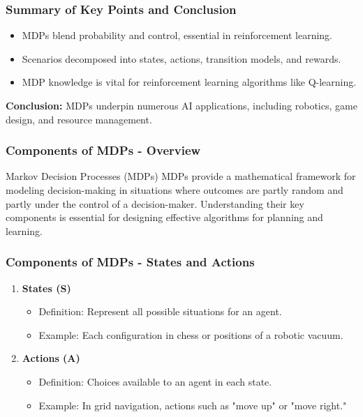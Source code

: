 \documentclass[aspectratio=169]{beamer}
\begin{document}
\begin{frame}[fragile]
    \frametitle{Summary of Key Points and Conclusion}
    \begin{itemize}
        \item MDPs blend probability and control, essential in reinforcement learning.
        \item Scenarios decomposed into states, actions, transition models, and rewards.
        \item MDP knowledge is vital for reinforcement learning algorithms like Q-learning.
    \end{itemize}
    
    \textbf{Conclusion:} MDPs underpin numerous AI applications, including robotics, game design, and resource management.
\end{frame}

\begin{frame}[fragile]
    \frametitle{Components of MDPs - Overview}
    \begin{block}{Markov Decision Processes (MDPs)}
        MDPs provide a mathematical framework for modeling decision-making in situations where outcomes are partly random and partly under the control of a decision-maker. Understanding their key components is essential for designing effective algorithms for planning and learning.
    \end{block}
\end{frame}

\begin{frame}[fragile]
    \frametitle{Components of MDPs - States and Actions}
    \begin{enumerate}
        \item \textbf{States (S)}
        \begin{itemize}
            \item Definition: Represent all possible situations for an agent.
            \item Example: Each configuration in chess or positions of a robotic vacuum.
        \end{itemize}
        
        \item \textbf{Actions (A)}
        \begin{itemize}
            \item Definition: Choices available to an agent in each state.
            \item Example: In grid navigation, actions such as "move up" or "move right." 
        \end{itemize}
    \end{enumerate}
\end{frame}
\end{document}
